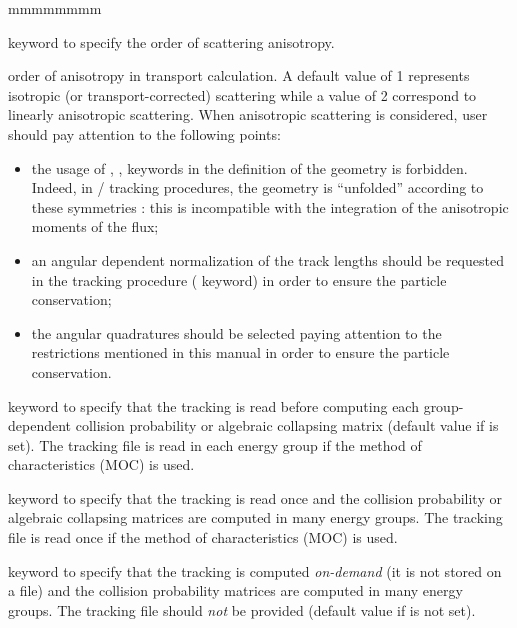 \begin{ListeDeDescription}{mmmmmmmm}

\item[\moc{ANIS}] keyword to specify the order of scattering anisotropy. 

\item[\dusa{nanis}] order of anisotropy in transport calculation.
A default value of 1 represents isotropic (or transport-corrected) scattering while a value of 2
correspond to linearly anisotropic scattering. When anisotropic scattering is considered, user should pay attention to the following points:
\begin{itemize}
\item the usage of , ,  keywords in the definition of the geometry is forbidden. Indeed, in / tracking procedures, the geometry is ``unfolded'' according to these symmetries : this is incompatible with the integration of the anisotropic moments of the flux; \\
\item an angular dependent normalization of the track lengths should be requested in the tracking procedure ( keyword) in order to ensure the particle conservation; \\
\item the angular quadratures should be selected paying attention to the restrictions mentioned in this manual in order to ensure the particle conservation.
\end{itemize}

\item[\moc{ONEG}] keyword to specify that the tracking is read before computing each group-dependent collision
probability or algebraic collapsing matrix (default value if  is set). The tracking file is
read in each energy group if the method of characteristics (MOC) is used.

\item[\moc{ALLG}] keyword to specify that the tracking is read once and the collision
probability or algebraic collapsing matrices are computed in many energy groups.  The tracking file is
read once if the method of characteristics (MOC) is used.
 
\item[\moc{XCLL}] keyword to specify that the tracking is computed {\sl on-demand} (it is not stored on a file) and the
collision probability matrices are computed in many energy groups. The tracking
file  should {\sl not} be provided (default value if  is not set).


\end{ListeDeDescription}
